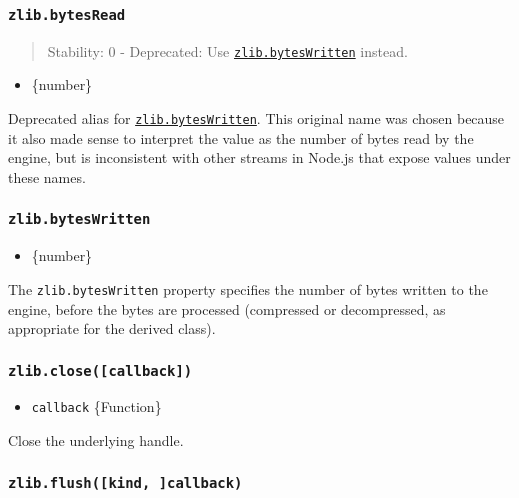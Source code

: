 \subsubsection{\texorpdfstring{\texttt{zlib.bytesRead}}{zlib.bytesRead}}\label{zlib.bytesread}

\begin{quote}
Stability: 0 - Deprecated: Use
\hyperref[zlibbyteswritten]{\texttt{zlib.bytesWritten}} instead.
\end{quote}

\begin{itemize}
\tightlist
\item
  \{number\}
\end{itemize}

Deprecated alias for
\hyperref[zlibbyteswritten]{\texttt{zlib.bytesWritten}}. This original
name was chosen because it also made sense to interpret the value as the
number of bytes read by the engine, but is inconsistent with other
streams in Node.js that expose values under these names.

\subsubsection{\texorpdfstring{\texttt{zlib.bytesWritten}}{zlib.bytesWritten}}\label{zlib.byteswritten}

\begin{itemize}
\tightlist
\item
  \{number\}
\end{itemize}

The \texttt{zlib.bytesWritten} property specifies the number of bytes
written to the engine, before the bytes are processed (compressed or
decompressed, as appropriate for the derived class).

\subsubsection{\texorpdfstring{\texttt{zlib.close({[}callback{]})}}{zlib.close({[}callback{]})}}\label{zlib.closecallback}

\begin{itemize}
\tightlist
\item
  \texttt{callback} \{Function\}
\end{itemize}

Close the underlying handle.

\subsubsection{\texorpdfstring{\texttt{zlib.flush({[}kind,\ {]}callback)}}{zlib.flush({[}kind, {]}callback)}}\label{zlib.flushkind-callback}

